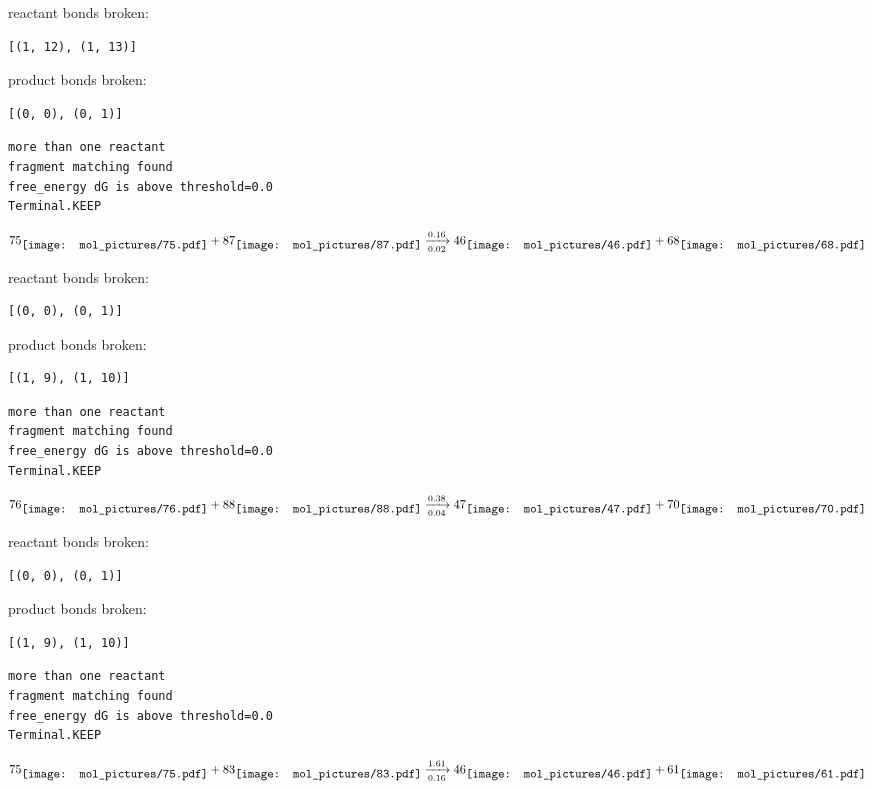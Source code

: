 \documentclass{article}
\begin{document}
reactant bonds broken:\begin{verbatim}
[(1, 12), (1, 13)]
\end{verbatim}
product bonds broken:\begin{verbatim}
[(0, 0), (0, 1)]
\end{verbatim}




\vspace{1cm}
\begin{verbatim}
more than one reactant
fragment matching found
free_energy dG is above threshold=0.0
Terminal.KEEP
\end{verbatim}
$$
75
\raisebox{-.5\height}{\texttt{[image: mol\_pictures/75.pdf]}}
+
87
\raisebox{-.5\height}{\texttt{[image: mol\_pictures/87.pdf]}}
\xrightarrow[0.02]{0.16}
46
\raisebox{-.5\height}{\texttt{[image: mol\_pictures/46.pdf]}}
+
68
\raisebox{-.5\height}{\texttt{[image: mol\_pictures/68.pdf]}}
$$


reactant bonds broken:\begin{verbatim}
[(0, 0), (0, 1)]
\end{verbatim}
product bonds broken:\begin{verbatim}
[(1, 9), (1, 10)]
\end{verbatim}




\vspace{1cm}
\begin{verbatim}
more than one reactant
fragment matching found
free_energy dG is above threshold=0.0
Terminal.KEEP
\end{verbatim}
$$
76
\raisebox{-.5\height}{\texttt{[image: mol\_pictures/76.pdf]}}
+
88
\raisebox{-.5\height}{\texttt{[image: mol\_pictures/88.pdf]}}
\xrightarrow[0.04]{0.38}
47
\raisebox{-.5\height}{\texttt{[image: mol\_pictures/47.pdf]}}
+
70
\raisebox{-.5\height}{\texttt{[image: mol\_pictures/70.pdf]}}
$$


reactant bonds broken:\begin{verbatim}
[(0, 0), (0, 1)]
\end{verbatim}
product bonds broken:\begin{verbatim}
[(1, 9), (1, 10)]
\end{verbatim}




\vspace{1cm}
\begin{verbatim}
more than one reactant
fragment matching found
free_energy dG is above threshold=0.0
Terminal.KEEP
\end{verbatim}
$$
75
\raisebox{-.5\height}{\texttt{[image: mol\_pictures/75.pdf]}}
+
83
\raisebox{-.5\height}{\texttt{[image: mol\_pictures/83.pdf]}}
\xrightarrow[0.16]{1.61}
46
\raisebox{-.5\height}{\texttt{[image: mol\_pictures/46.pdf]}}
+
61
\raisebox{-.5\height}{\texttt{[image: mol\_pictures/61.pdf]}}
$$
\end{document}
